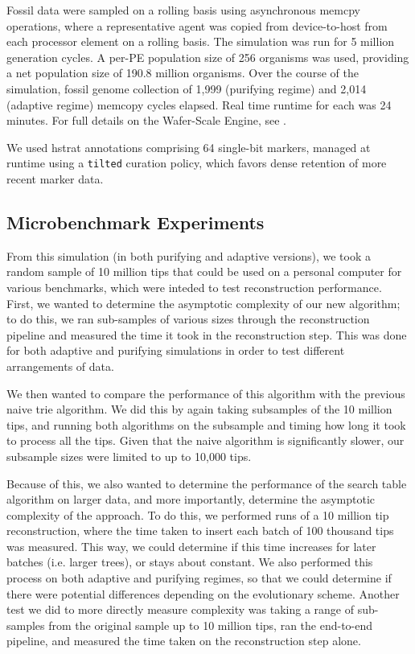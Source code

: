 Fossil data were sampled on a rolling basis using asynchronous memcpy operations, where a representative agent was copied from device-to-host from each processor element on a rolling basis.
The simulation was run for 5 million generation cycles.
A per-PE population size of 256 organisms was used, providing a net population size of 190.8 million organisms.
Over the course of the simulation, fossil genome collection of 1,999 (purifying regime) and 2,014 (adaptive regime) memcopy cycles elapsed.
Real time runtime for each was 24 minutes.
For full details on the Wafer-Scale Engine, see \citep{moreno2024trackable}.

We used hstrat annotations comprising 64 single-bit markers, managed at runtime using a \texttt{tilted} curation policy, which favors dense retention of more recent marker data.

\subsection{Microbenchmark Experiments}

From this simulation (in both purifying and adaptive versions), we took a random sample of 10 million tips that could be used on a personal computer for various benchmarks, which were inteded to test reconstruction performance.
First, we wanted to determine the asymptotic complexity of our new algorithm; to do this, we ran sub-samples of various sizes through the reconstruction pipeline and measured the time it took in the reconstruction step.
This was done for both adaptive and purifying simulations in order to test different arrangements of data.

We then wanted to compare the performance of this algorithm with the previous naive trie algorithm.
We did this by again taking subsamples of the 10 million tips, and running both algorithms on the subsample and timing how long it took to process all the tips.
Given that the naive algorithm is significantly slower, our subsample sizes were limited to up to 10,000 tips.

Because of this, we also wanted to determine the performance of the search table algorithm on larger data, and more importantly, determine the asymptotic complexity of the approach. 
To do this, we performed runs of a 10 million tip reconstruction, where the time taken to insert each batch of 100 thousand tips was measured.
This way, we could determine if this time increases for later batches (i.e. larger trees), or stays about constant.
We also performed this process on both adaptive and purifying regimes, so that we could determine if there were potential differences depending on the evolutionary scheme.
Another test we did to more directly measure complexity was taking a range of sub-samples from the original sample up to 10 million tips, ran the end-to-end pipeline, and measured the time taken on the reconstruction step alone.

